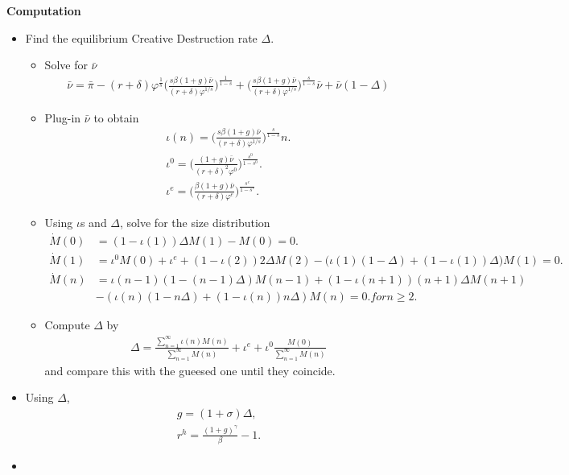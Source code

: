 \documentclass[a4paper,12pt]{article}
\begin{document}
\textbf{Computation}
\begin{itemize}
    \item Find the equilibrium Creative Destruction rate $\Delta$.
    \begin{itemize}
        \item Solve for $\bar{\nu}$
        \begin{align}
            \bar{\nu} = \bar{\pi} -(r+\delta) \varphi^\frac{1}{s}\Big(\frac{s\beta (1+g)\bar\nu}{(r+\delta)\varphi^{1/s}}\Big)^\frac{1}{1-s} + \Big(\frac{s\beta (1+g)\bar\nu}{(r+\delta)\varphi^{1/s}}\Big)^\frac{s}{1-s} \bar{\nu} + \bar{\nu}(1-\Delta)
        \end{align}
        \item Plug-in $\bar{\nu}$ to obtain
        \begin{align}
            \iota(n) = \Big(\frac{s\beta (1+g)\bar\nu}{(r+\delta)\varphi^{1/s}}\Big)^\frac{s}{1-s}n.\\
            \iota^0 = \Big(\frac{(1+g)\bar \nu}{(r+\delta)^2\varphi^0}\Big)^\frac{s^0}{1-s^0}.\\
            \iota^e = \Big(\frac{\beta (1+g)\bar \nu}{(r+\delta)\varphi^e}\Big)^\frac{s^e}{1-s^e}.
        \end{align}
        \item Using $\iota$s and $\Delta$, solve for the size distribution
        \begin{align}
            \dot{M}(0) &= (1-\iota(1))\Delta M(1) - M(0) = 0.\\
            \dot{M}(1) &= \iota^0 M(0) + \iota^e+(1-\iota(2))2\Delta M(2)-\big(\iota(1)(1-\Delta)+ (1-\iota(1))\Delta \big)M(1) = 0.\\
            \dot{M}(n) &= \iota(n-1)(1-(n-1)\Delta)M(n-1)+(1-\iota(n+1))(n+1)\Delta M(n+1) \\
            &- (\iota(n)(1-n\Delta) + (1-\iota(n))n \Delta )M(n) =0. for n\geq 2.
        \end{align}
        \item Compute $\Delta$ by
        \begin{align}
            \Delta = \frac{\sum_{n=1}^\infty \iota(n)M(n)}{\sum_{n=1}^\infty M(n)}+ \iota^e + \iota^0 \frac{M(0)}{\sum_{n=1}^{\infty}M(n)}
        \end{align}
        and compare this with the gueesed one until they coincide.
    \end{itemize}
    \item Using $\Delta$, 
    \begin{align}
        g = (1+\sigma) \Delta, \\
        r^h = \frac{(1+g)^\gamma }{\beta} - 1.
    \end{align}
    \item 
\end{itemize}
\end{document}
